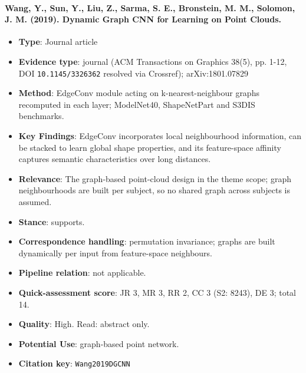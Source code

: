 \documentclass[journal,onecolumn]{IEEEtran}
\begin{document}
\paragraph{Wang, Y., Sun, Y., Liu, Z., Sarma, S. E., Bronstein, M. M., Solomon, J. M. (2019). Dynamic Graph CNN for Learning on Point Clouds.~\cite{Wang2019DGCNN}}\mbox{}

\begin{itemize}

\item{} \textbf{Type}: Journal article

\item{} \textbf{Evidence type}: journal (ACM Transactions on Graphics 38(5), pp. 1-12, DOI \nolinkurl{10.1145/3326362} resolved via Crossref); arXiv:1801.07829

\item{} \textbf{Method}: EdgeConv module acting on k-nearest-neighbour graphs recomputed in each layer; ModelNet40, ShapeNetPart and S3DIS benchmarks.

\item{} \textbf{Key Findings}: EdgeConv incorporates local neighbourhood information, can be stacked to learn global shape properties, and its feature-space affinity captures semantic characteristics over long distances.

\item{} \textbf{Relevance}: The graph-based point-cloud design in the theme scope; graph neighbourhoods are built per subject, so no shared graph across subjects is assumed.

\item{} \textbf{Stance}: supports.

\item{} \textbf{Correspondence handling}: permutation invariance; graphs are built dynamically per input from feature-space neighbours.

\item{} \textbf{Pipeline relation}: not applicable.

\item{} \textbf{Quick-assessment score}: JR 3, MR 3, RR 2, CC 3 (S2: 8243), DE 3; total 14.

\item{} \textbf{Quality}: High. Read: abstract only.

\item{} \textbf{Potential Use}: graph-based point network.

\item{} \textbf{Citation key}: \texttt{Wang2019DGCNN}

\end{itemize}
\end{document}
